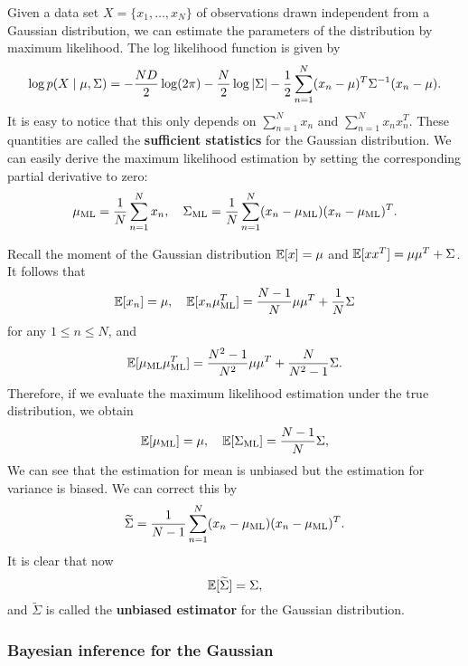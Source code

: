 \documentclass[a4paper]{article}
\begin{document}
Given a data set $X = \{x_1, \dots, x_N\}$ of observations 
drawn independent from a Gaussian distribution, we can 
estimate the parameters of the distribution by maximum 
likelihood. The log likelihood function is given by
\[
\log p(X \mid \mu, \Sigma)
= -\frac{N D}{2} \log (2 \pi) - \frac{N}{2} \log \left\lvert \Sigma\right\rvert
- \frac{1}{2} \sum_{n=1}^N (x_n - \mu)^T \Sigma^{-1} 
(x_n - \mu).
\]
It is easy to notice that this only depends on $\sum_{n=1}^N 
x_n$ and $\sum_{n=1}^N x_n x_n^T$. These quantities are 
called the \textbf{sufficient statistics} for the Gaussian 
distribution. We can easily 
derive the maximum likelihood estimation by setting the
corresponding partial derivative to zero: 
\[
\mu_{\text{ML}} = \frac{1}{N} \sum_{n=1}^N x_n, 
\quad 
\Sigma_{\text{ML}} = \frac{1}{N} \sum_{n=1}^N 
(x_n - \mu_{\text{ML}}) (x_n - \mu_{\text{ML}})^T.
\]

Recall the moment of the Gaussian distribution 
$\mathbb{E}[x] = \mu$ and $\mathbb{E}[x x^T] = \mu \mu^T + \Sigma$.
It follows that 
\[
\begin{aligned}
\mathbb{E}[x_n] = \mu, 
\quad 
\mathbb{E}[x_n \mu_{\text{ML}}^T] 
= \frac{N - 1}{N} \mu \mu^T + \frac{1}{N} \Sigma
\end{aligned}
\]
for any $1 \leq n \leq N$, and 
\[
\mathbb{E}[\mu_{\text{ML}} \mu_{\text{ML}}^T]
= \frac{N^2 - 1}{N^2} \mu \mu^T 
+ \frac{N}{N^2 - 1} \Sigma.
\]
Therefore, if we evaluate the maximum likelihood estimation 
under the true distribution, we obtain
\[
\mathbb{E}[\mu_{\text{ML}}] = \mu,
\quad 
\mathbb{E}[\Sigma_{\text{ML}}] = \frac{N - 1}{N} \Sigma,
\]
We can see that the estimation for mean is unbiased but the 
estimation for variance is biased. We can correct this 
by 
\[
\widetilde{\Sigma} = \frac{1}{N - 1} \sum_{n=1}^N 
(x_n - \mu_{\text{ML}}) (x_n - \mu_{\text{ML}})^T.
\]
It is clear that now 
\[
\mathbb{E}[\widetilde{\Sigma}] = \Sigma,
\]
and $\tilde{\Sigma}$ is called the \textbf{unbiased 
estimator} for the Gaussian distribution.

\subsubsection{Bayesian inference for the Gaussian}
\end{document}

